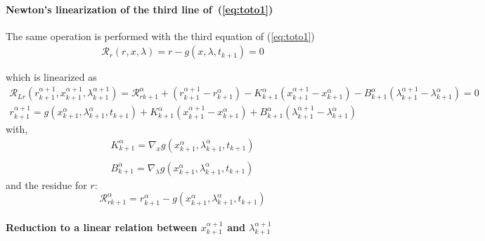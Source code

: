  \paragraph{Newton's linearization of the third  line of~(\ref{eq:toto1})}
The same operation is performed with the third equation of (\ref{eq:toto1})
\begin{equation}
  \begin{array}{l}
    \mathcal R_r(r,x,\lambda)=r-g(x,\lambda,t_{k+1}) =0\\ \\  \end{array}
\end{equation}
which is linearized as
\begin{equation}
  \label{eq:NL9}
  \begin{array}{l}
      \mathcal R_{Lr}(r^{\alpha+1}_{k+1},x^{\alpha+1}_{k+1},\lambda^{\alpha+1}_{k+1}) = \mathcal
      R_{rk+1}^{\alpha} + (r^{\alpha+1}_{k+1} - r^{\alpha}_{k+1}) -
      K^{\alpha}_{k+1}(x^{\alpha+1}_{k+1} - x^{\alpha}_{k+1})- B^{\alpha}_{k+1}(\lambda^{\alpha+1}_{k+1} -
      \lambda^{\alpha}_{k+1})=0
    \end{array}
  \end{equation}
\begin{equation}
  \label{eq:rrL}
  \begin{array}{l}
    \boxed{r^{\alpha+1}_{k+1} = g(x ^{\alpha}_{k+1},\lambda ^{\alpha}_{k+1},t_{k+1}) +
      K^{\alpha}_{k+1}(x^{\alpha+1}_{k+1} - x^{\alpha}_{k+1})
      + B^{\alpha}_{k+1}(\lambda^{\alpha+1}_{k+1} - \lambda^{\alpha}_{k+1})
    }       
  \end{array}
\end{equation}
with,
\begin{equation}
     \begin{array}{l}
  K^{\alpha}_{k+1} = \nabla_xg(x^{\alpha}_{k+1},\lambda ^{\alpha}_{k+1},t_{k+1})  \\ \\
  B^{\alpha}_{k+1} = \nabla_{\lambda}g(x^{\alpha}_{k+1},\lambda ^{\alpha}_{k+1},t_{k+1})
 \end{array}
\end{equation}
and the  residue for $r$:
\begin{equation}
\boxed{\mathcal
      R_{rk+1}^{\alpha} = r^{\alpha}_{k+1} - g(x^{\alpha}_{k+1},\lambda ^{\alpha}_{k+1},t_{k+1})}
  \end{equation}


\paragraph{Reduction to a linear relation between  $x^{\alpha+1}_{k+1}$ and
$\lambda^{\alpha+1}_{k+1}$}

